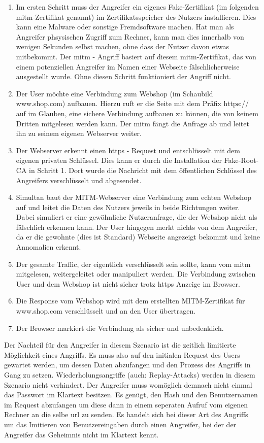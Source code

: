 \begin{enumerate} 
\item Im ersten Schritt muss der Angreifer ein eigenes Fake-Zertifikat (im folgenden \ac{mitm}-Zertifikat genannt) im Zertifikatsspeicher des Nutzers installieren. Dies kann eine Malware oder sonstige Fremdsoftware machen. Hat man als Angreifer phsysischen Zugriff zum Rechner, kann man dies innerhalb von wenigen Sekunden selbst machen, ohne dass der Nutzer davon etwas mitbekommt. Der \ac{mitm} - Angriff basiert auf diesem \ac{mitm}-Zertifikat, das von einem potenziellen Angreifer im Namen einer Webseite fälschlicherweise ausgestellt wurde. Ohne diesen Schritt funktioniert der Angriff nicht.
\item Der User möchte eine Verbindung zum Webshop (im Schaubild www.shop.com) aufbauen. Hierzu ruft er die Seite mit dem Präfix https:// auf im Glauben, eine sichere Verbindung aufbauen zu können, die von keinem Dritten mitgelesen werden kann. Der \ac{mitm} fängt die Anfrage ab und leitet ihn zu seinem eigenen Webserver weiter.
\newpage
\item Der Webserver erkennt einen \ac{https} - Request und entschlüsselt mit dem eigenen privaten Schlüssel. Dies kann er durch die Installation der Fake-Root-CA in Schritt 1. Dort wurde die Nachricht mit dem öffentlichen Schlüssel des Angreifers verschlüsselt und abgesendet.
\item Simultan baut der MITM-Webserver eine Verbindung zum echten Webshop auf und leitet die Daten des Nutzers jeweils in beide Richtungen weiter. Dabei simuliert er eine gewöhnliche Nutzeranfrage, die der Webshop nicht als fälschlich erkennen kann. Der User hingegen merkt nichts von dem Angreifer, da er die gewohnte (dies ist Standard) Webseite angezeigt bekommt und keine Annomalien erkennt.
\item Der gesamte Traffic, der eigentlich verschlüsselt sein sollte, kann vom \ac{mitm} mitgelesen, weitergeleitet oder manipuliert werden. Die Verbindung zwischen User und dem Webshop ist nicht sicher trotz \ac{https} Anzeige im Browser.
\item Die Response vom Webshop wird mit dem erstellten MITM-Zertifikat für www.shop.com verschlüsselt und an den User übertragen.
\item Der Browser markiert die Verbindung als sicher und unbedenklich.
\end{enumerate}

Der Nachteil für den Angreifer in diesem Szenario ist die zeitlich limitierte Möglichkeit eines Angriffs. Es muss also auf den initialen Request des Users gewartet werden, um dessen Daten abzufangen und den Prozess des Angriffs in Gang zu setzen. Wiederholungsangriffe (auch: Replay-Attacks) werden in diesem Szenario nicht verhindert. Der Angreifer muss womöglich demnach nicht einmal das Passwort im Klartext besitzen. Es genügt, den Hash und den Benutzernamen im Request abzufangen um diese dann in einem seperaten Aufruf vom eigenen Rechner an die selbe \ac{url} zu senden. Es handelt sich bei dieser Art des Angriffs um das Imitieren von Benutzereingaben durch einen Angreifer, bei der der Angreifer das Geheimnis nicht im Klartext kennt.

